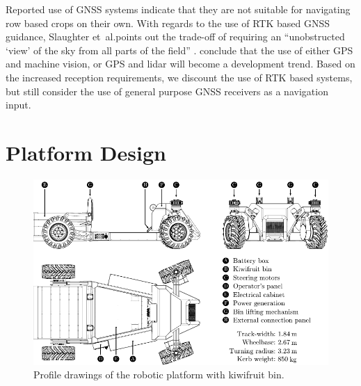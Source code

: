 \documentclass[preprint,authoryear,12pt]{elsarticle}
\begin{document}
        Reported use of GNSS systems indicate that they are not suitable for navigating row based crops on their own.
        With regards to the use of RTK based GNSS guidance, Slaughter et~al.\@ points out the trade-off of requiring an ``unobstructed `view' of the sky from all parts of the field'' \citep{Slaughter2008}.
        \cite{Li2009} conclude that the use of either GPS and machine vision, or GPS and lidar will become a development trend.
        Based on the increased reception requirements, we discount the use of RTK based systems, but still consider the use of general purpose GNSS receivers as a navigation input.

\section{Platform Design}
\label{sect:design}
        \begin{figure}[htb]
            \centering
            \includegraphics[width=\linewidth]{imgs/profile_views/AMMP-All-Labelled.pdf}
            \caption{Profile drawings of the robotic platform with kiwifruit bin.}
            \label{fig:AMMP}
        \end{figure}
\end{document}
